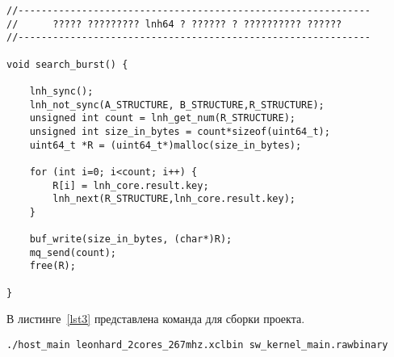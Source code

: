 \begin{lstlisting}[caption={Код программы по индивидуальному варианту sw\_kernel\_main.c}, label=lst2, style=Go]
//-------------------------------------------------------------
//      ????? ????????? lnh64 ? ?????? ? ?????????? ?????? 
//-------------------------------------------------------------
 
void search_burst() {

    lnh_sync(); 
    lnh_not_sync(A_STRUCTURE, B_STRUCTURE,R_STRUCTURE);
    unsigned int count = lnh_get_num(R_STRUCTURE);
    unsigned int size_in_bytes = count*sizeof(uint64_t);
    uint64_t *R = (uint64_t*)malloc(size_in_bytes);
    
    for (int i=0; i<count; i++) {
        R[i] = lnh_core.result.key;
        lnh_next(R_STRUCTURE,lnh_core.result.key);
    }
    
    buf_write(size_in_bytes, (char*)R);   
    mq_send(count);
    free(R);

}
\end{lstlisting}
\par В листинге~\ref{lst3} представлена команда для сборки проекта.
\begin{lstlisting}[caption={Код программы по индивидуальному варианту sw\_kernel\_main.c}, label=lst3, style=Go]
./host_main leonhard_2cores_267mhz.xclbin sw_kernel_main.rawbinary
\end{lstlisting}
\newpage